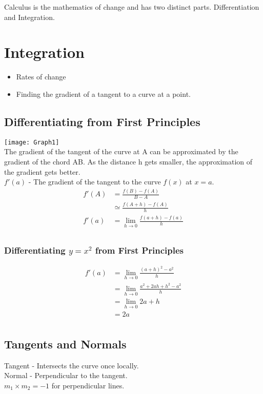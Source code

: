 \documentclass[class=article, crop=false]{standalone}
\begin{document}
Calculus is the mathematics of change and has two distinct parts. Differentiation and Integration. 
\section*{Integration}
\begin{itemize}
	\item Rates of change
	\item Finding the gradient of a tangent to a curve at a point. 
\end{itemize}
\subsection*{Differentiating from First Principles}
\texttt{[image: Graph1]}\\
The gradient of the tangent of the curve at A can be approximated by the gradient of the chord AB. As the distance h gets smaller, the approximation of the gradient gets better.  \\
$f'(a)$ - The gradient of the tangent to the curve $f(x)$ at $x=a$. \\
\begin{align*}
f'(A) & = \frac{f(B) - f(A)}{B - A} \\
& \simeq \frac{f(A+h) - f(A)}{h} \\
f'(a) & = \lim_{h \to 0} \frac{f(a+h) - f(a)}{h} \\
\end{align*}
\subsubsection*{Differentiating $y = x^2$ from First Principles}
\begin{align*}
f'(a) & = \lim_{h \to 0} \frac{(a + h)^2 - a^2}{h} \\
& = \lim_{h \to 0} \frac{a^2 + 2ah + h^2 - a^2}{h} \\
& = \lim_{h \to 0} 2a + h \\
& = 2a \\
\end{align*}
\subsection*{Tangents and Normals}
Tangent - Intersects the curve once locally. \\
Normal - Perpendicular to the tangent. \\ 
$m_1 \times m_2 = -1$ for perpendicular lines. \\ 
\end{document}
